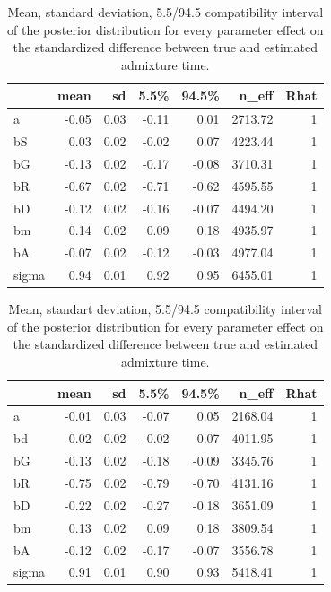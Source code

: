 \documentclass[11pt]{article}
\begin{document}
\begin{table}[H]

\caption{\label{tab:tableS1_1} Mean, standard deviation, 5.5/94.5 compatibility interval of the posterior distribution for every parameter effect on the standardized difference between true and estimated admixture time.}
\centering
\begin{tabular}[t]{l|r|r|r|r|r|r}
\hline
  & mean & sd & 5.5\% & 94.5\% & n\_eff & Rhat\\
\hline
a & -0.05 & 0.03 & -0.11 & 0.01 & 2713.72 & 1\\
\cline{1-7}
bS & 0.03 & 0.02 & -0.02 & 0.07 & 4223.44 & 1\\
\cline{1-7}
bG & -0.13 & 0.02 & -0.17 & -0.08 & 3710.31 & 1\\
\cline{1-7}
bR & -0.67 & 0.02 & -0.71 & -0.62 & 4595.55 & 1\\
\cline{1-7}
bD & -0.12 & 0.02 & -0.16 & -0.07 & 4494.20 & 1\\
\cline{1-7}
bm & 0.14 & 0.02 & 0.09 & 0.18 & 4935.97 & 1\\
\cline{1-7}
bA & -0.07 & 0.02 & -0.12 & -0.03 & 4977.04 & 1\\
\cline{1-7}
sigma & 0.94 & 0.01 & 0.92 & 0.95 & 6455.01 & 1\\
\hline
\end{tabular}
\end{table}

\begin{table}[H]

\caption{\label{tab:tableS1_1}\label{tab:tableS1} Mean, standart deviation, 5.5/94.5 compatibility interval of the posterior distribution for every parameter effect on the standardized difference between true and estimated admixture time.}
\centering
\begin{tabular}[t]{l|r|r|r|r|r|r}
\hline
  & mean & sd & 5.5\% & 94.5\% & n\_eff & Rhat\\
\hline
a & -0.01 & 0.03 & -0.07 & 0.05 & 2168.04 & 1\\
\cline{1-7}
bd & 0.02 & 0.02 & -0.02 & 0.07 & 4011.95 & 1\\
\cline{1-7}
bG & -0.13 & 0.02 & -0.18 & -0.09 & 3345.76 & 1\\
\cline{1-7}
bR & -0.75 & 0.02 & -0.79 & -0.70 & 4131.16 & 1\\
\cline{1-7}
bD & -0.22 & 0.02 & -0.27 & -0.18 & 3651.09 & 1\\
\cline{1-7}
bm & 0.13 & 0.02 & 0.09 & 0.18 & 3809.54 & 1\\
\cline{1-7}
bA & -0.12 & 0.02 & -0.17 & -0.07 & 3556.78 & 1\\
\cline{1-7}
sigma & 0.91 & 0.01 & 0.90 & 0.93 & 5418.41 & 1\\
\hline
\end{tabular}
\end{table}
\end{document}
